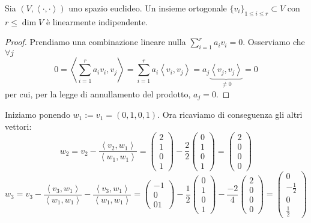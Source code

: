\documentclass{article}     %
\newcommand{\scp}[1][\cdot,\cdot]{\left\langle #1 \right\rangle}
\begin{document}
\begin{prop}
    Sia $(V,\scp)$ uno spazio euclideo. Un insieme ortogonale $\{v_i\}_{1\leq i\leq r}\subset V$ con $r\leq \dim V$ è linearmente indipendente.
\end{prop}
\begin{proof}
    Prendiamo una combinazione lineare nulla $\sum_{i=1}^ra_iv_i=0$. Osserviamo che $\forall j$
    \[0=\scp[\sum_{i=1}^ra_iv_i,v_j] = \sum_{i=1}^ra_i\scp[v_i,v_j]=a_j\underbrace{\scp[v_j,v_j]}_{\neq 0}=0\]
    per cui, per la legge di annullamento del prodotto, $a_j=0$.
\end{proof}
\begin{ex}
    [Consideriamo $\R^4$ con la base canonica e il prodotto scalare standard. Siano $v_1=(0,1,0,1)$, $v_2=(2,1,0,1)$, $v_3=(-1,0,0,1)$ e $v_4=(0,0,1,0)$. Ortogonalizzare questo insieme di vettori]
    Iniziamo ponendo $w_1:=v_1=(0,1,0,1)$. Ora ricaviamo di conseguenza gli altri vettori:
    \[w_2=v_2-\frac{\scp[v_2,w_1]}{\scp[w_1,w_1]}=\begin{pmatrix}
        2\\1\\0\\1
    \end{pmatrix}-\frac{2}{2}\begin{pmatrix}
        0\\1\\0\\1
    \end{pmatrix}=\begin{pmatrix}
        2\\0\\0\\0
    \end{pmatrix}\]
    \[w_3=v_3-\frac{\scp[v_3,w_1]}{\scp[w_1,w_1]}-\frac{\scp[v_3,w_1]}{\scp[w_1,w_1]}= \begin{pmatrix}
        -1\\0\\01
    \end{pmatrix}-\frac{1}{2}\begin{pmatrix}
        0\\1\\0\\1
    \end{pmatrix}-\frac{-2}{4}\begin{pmatrix}
        2\\0\\0\\0
    \end{pmatrix}=\begin{pmatrix}
        0\\-\textstyle\frac{1}{2}\\0\\\textstyle\frac{1}{2}
    \end{pmatrix}\]


\end{ex}
\end{document}

